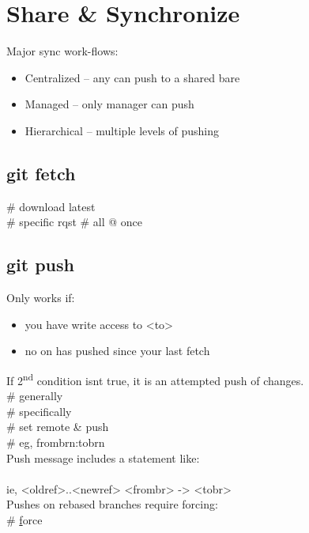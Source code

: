 \section{Share \& Synchronize}
Major sync work-flows:
\begin{itemize}
    \item Centralized -- any can push to a shared bare
    \item Managed -- only manager can push
    \item Hierarchical -- multiple levels of pushing
\end{itemize}


\subsection*{git fetch}
 \# download latest \\
 \# specific rqst
 \# all @ once


\subsection*{git push}
Only works if: \begin{itemize}[partopsep=0pt,topsep=0pt,parsep=0pt]
    \item you have write access to <to>
    \item no on has pushed since your last fetch
\end{itemize}
If 2\textsuperscript{nd} condition isn\textquotesingle t true, it is an attempted push of  changes.\\
 \# generally \\
 \# specifically \\
 \# set remote \& push\\
 \# eg, frombrn:tobrn \\
Push message includes a statement like:\\
\\
ie, <oldref>..<newref> <frombr> -> <tobr>\\
Pushes on rebased branches require forcing:\\
 \# \underline{f}orce


